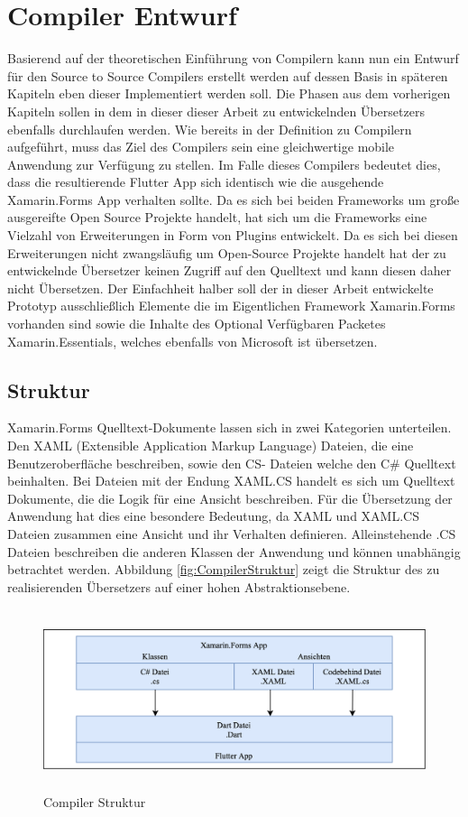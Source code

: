 \chapter{Compiler Entwurf}
Basierend auf der theoretischen Einführung von Compilern kann nun ein Entwurf für den Source to Source Compilers erstellt werden auf dessen Basis in späteren Kapiteln eben dieser Implementiert werden soll.  Die Phasen aus dem vorherigen Kapiteln sollen in dem in dieser dieser Arbeit zu entwickelnden Übersetzers ebenfalls durchlaufen werden.  
Wie bereits in der Definition zu Compilern aufgeführt,  muss das Ziel des Compilers sein eine gleichwertige mobile Anwendung zur Verfügung zu stellen.  Im Falle dieses Compilers bedeutet dies,  dass die resultierende Flutter App sich identisch wie die ausgehende Xamarin.Forms App verhalten sollte.  Da es sich bei beiden Frameworks um große ausgereifte Open Source Projekte handelt,  hat sich um die Frameworks eine Vielzahl von Erweiterungen in Form von Plugins entwickelt.  Da es sich bei diesen Erweiterungen nicht zwangsläufig um Open-Source Projekte handelt hat der zu entwickelnde Übersetzer keinen Zugriff auf den Quelltext und kann diesen daher nicht Übersetzen.  Der Einfachheit halber soll der in dieser Arbeit entwickelte Prototyp ausschließlich Elemente die im Eigentlichen Framework Xamarin.Forms vorhanden sind sowie die Inhalte des Optional Verfügbaren Packetes Xamarin.Essentials, welches ebenfalls von Microsoft ist übersetzen. 

\section{Struktur}

Xamarin.Forms Quelltext-Dokumente lassen sich in zwei Kategorien unterteilen.  Den XAML (Extensible Application Markup Language) Dateien,  die eine Benutzeroberfläche beschreiben,  sowie den CS- Dateien welche den C\# Quelltext beinhalten.  Bei Dateien mit der Endung XAML.CS  handelt es sich um Quelltext Dokumente,  die die Logik für eine Ansicht beschreiben.  Für die Übersetzung der Anwendung hat dies eine besondere Bedeutung,  da XAML und XAML.CS Dateien zusammen eine Ansicht und ihr Verhalten definieren.  Alleinstehende .CS Dateien beschreiben die anderen Klassen der Anwendung und können unabhängig betrachtet werden.  Abbildung \ref{fig:CompilerStruktur} zeigt die Struktur des zu realisierenden Übersetzers auf einer hohen Abstraktionsebene.
\begin{figure}[!ht]
 \includegraphics[width=14.5cm,height=5.3cm]{Images/Compiler/CompilerArchitecture.png}
 \caption{Compiler Struktur}
 \label{fig:}
\end{figure}


